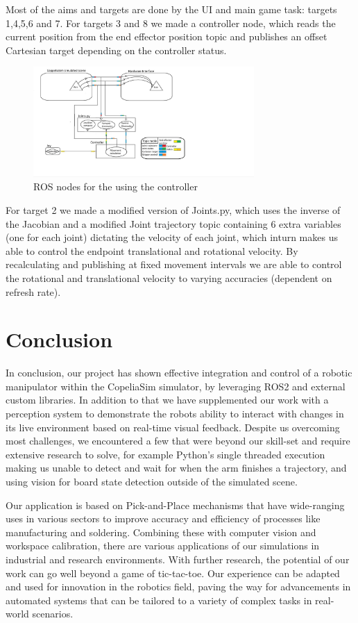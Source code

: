 \documentclass{article}
\begin{document}
Most of the aims and targets are done by the UI and main game task: targets 1,4,5,6 and 7.
For targets 3 and 8 we made a controller node, which reads the current position from the end effector position topic and publishes an offset Cartesian target depending on the controller status. 

\begin{figure}[h]
    \centering\includegraphics[width=0.75\textwidth]{controller}
    \caption{ROS nodes for the using the controller}
\end{figure}

 For target 2 we made a modified version of Joints.py, which uses the inverse of the Jacobian and a modified Joint trajectory topic containing 6 extra variables (one for each joint) dictating the velocity of each joint, which inturn makes us able to control the endpoint translational and rotational velocity. By recalculating and publishing at fixed movement intervals we are able to control the rotational and translational velocity to varying accuracies (dependent on refresh rate).

\section{Conclusion}

In conclusion, our project has shown effective integration and control of a robotic manipulator within the CopeliaSim simulator, by leveraging ROS2 and external custom libraries. In addition to that we have supplemented our work with a perception system to demonstrate the robots ability to interact with changes in its live environment based on real-time visual feedback. Despite us overcoming most challenges, we encountered a few that were beyond our skill-set and require extensive research to solve, for example Python's single threaded execution making us unable to detect and wait for when the arm finishes a trajectory, and using vision for board state detection outside of the simulated scene. 

Our application is based on Pick-and-Place mechanisms that have wide-ranging uses in various sectors to improve accuracy and efficiency of processes like manufacturing and soldering. Combining these with computer vision and workspace calibration, there are various applications of our simulations in industrial and research environments. With further research, the potential of our work can go well beyond a game of tic-tac-toe. Our experience can be adapted and used for innovation in the robotics field, paving the way for advancements in automated systems that can be tailored to a variety of complex tasks in real-world scenarios.

\printbibliography[heading=bibintoc]
\end{document}
